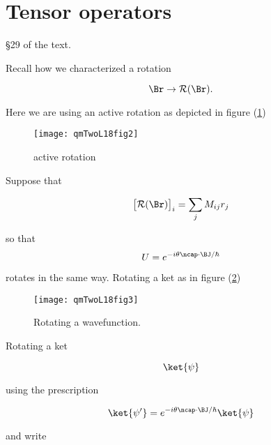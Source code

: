 \section{Tensor operators}

\S 29 of the text.

Recall how we characterized a rotation

\begin{equation}\label{eqn:qmTwoL18:410}
\Br \rightarrow \mathcal{R}(\Br).
\end{equation}

Here we are using an active rotation as depicted in figure (\ref{fig:qmTwoL18:qmTwoL18fig2})

\begin{figure}[htp]
   \centering
   \texttt{[image: qmTwoL18fig2]}
   \caption{active rotation}\label{fig:qmTwoL18:qmTwoL18fig2}
\end{figure}

Suppose that 

\begin{equation}\label{eqn:qmTwoL18:430}
{\begin{bmatrix}
\mathcal{R}(\Br)
\end{bmatrix}
}_i
= 
\sum_j M_{ij} r_j
\end{equation}

so that
\begin{equation}\label{eqn:qmTwoL18:450}
U = e^{-i \theta \ncap \cdot \BJ/\hbar}
\end{equation}

rotates in the same way.  Rotating a ket as in figure (\ref{fig:qmTwoL18:qmTwoL18fig3})
\begin{figure}[htp]
   \centering
   \texttt{[image: qmTwoL18fig3]}
   \caption{Rotating a wavefunction.}\label{fig:qmTwoL18:qmTwoL18fig3}
\end{figure}

Rotating a ket

\begin{equation}\label{eqn:qmTwoL18:470}
\ket{\psi}
\end{equation}

using the prescription

\begin{equation}\label{eqn:qmTwoL18:490}
\ket{\psi'} = e^{-i \theta \ncap \cdot \BJ/\hbar} \ket{\psi}
\end{equation}

and write

